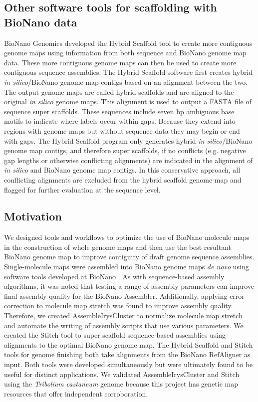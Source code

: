 \documentclass{bmcart}
\begin{document}
\subsection*{Other software tools for scaffolding with BioNano data}
BioNano Genomics developed the Hybrid Scaffold tool to create more contiguous genome maps using information from both sequence and BioNano genome map data. These more contiguous genome maps can then be used to create more contiguous sequence assemblies. The Hybrid Scaffold software first creates hybrid \textit{in silico}/BioNano genome map contigs based on an alignment between the two. The output genome maps are called hybrid scaffolds and are aligned to the original \textit{in silico} genome maps. This alignment is used to output a FASTA file of sequence super scaffolds. These sequences include seven bp ambiguous base motifs to indicate where labels occur within gaps. Because they extend into regions with genome maps but without sequence data they may begin or end with gaps. The Hybrid Scaffold program only generates hybrid \textit{in silico}/BioNano genome map contigs, and therefore super scaffolds, if no conflicts (e.g. negative gap lengths or otherwise conflicting alignments) are indicated in the alignment of \textit{in silico} and BioNano genome map contigs. In this conservative approach, all conflicting alignments are excluded from the hybrid scaffold genome map and flagged for further evaluation at the sequence level.

\subsection*{Motivation}
We designed tools and workflows to optimize the use of BioNano molecule maps in the construction of whole genome maps and then use the best resultant BioNano genome map to improve contiguity of draft genome sequence assemblies. Single-molecule maps were assembled into BioNano genome maps \textit{de novo} using software tools developed at BioNano \cite{BioNanoSV2014}. As with sequence-based assembly algorithms, it was noted that testing a range of assembly parameters can improve final assembly quality for the BioNano Assembler. Additionally, applying error correction to molecule map stretch was found to improve assembly quality. Therefore, we created AssembleIrysCluster to normalize molecule map stretch and automate the writing of assembly scripts that use various parameters. We created the Stitch tool to super scaffold sequence-based assemblies using alignments to the optimal BioNano genome map. The Hybrid Scaffold and Stitch tools for genome finishing both take alignments from the BioNano RefAligner as input. Both tools were developed simultaneously but were ultimately found to be useful for distinct applications. We validated AssembleIrysCluster and Stitch using the \textit{Tribolium castaneum} genome \cite{Beetle2008} because this project has genetic map resources \cite{BeetleGenMap2005} that offer independent corroboration.
\end{document}
